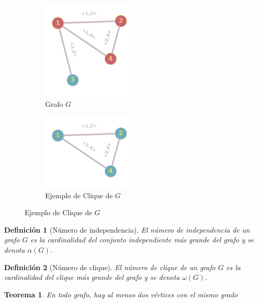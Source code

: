 \documentclass[a4paper,1pt]{report}
\newtheorem*{teo}{Teorema}
\newtheorem*{dfn}{Definición}
\begin{document}
\begin{figure}[H]
    \centering
    \begin{subfigure}[b]{0.45\textwidth}
    \centering
    \includegraphics[width=0.5\textwidth]{figures/clique.png}
    \caption{Grafo $G$}
    \end{subfigure}
    \begin{subfigure}[b]{0.45\textwidth}
        \centering
    \includegraphics[width=0.5\textwidth]{figures/clique1.png}
    \caption{Ejemplo de Clique de $G$}
    \end{subfigure}
\end{figure} 

\begin{dfn}[N\'umero de independencia]
    El número de independencia de un grafo $G$ es la cardinalidad del conjunto independiente más grande del grafo y se denota $\alpha(G)$.
\end{dfn}

\begin{dfn}[N\'umero de clique]
    El número de clique de un grafo $G$ es la cardinalidad del clique más grande del grafo y se denota $\omega(G)$.
\end{dfn}

\begin{teo}
    En todo grafo, hay al menos dos v\'ertices con el mismo grado
\end{teo}
\end{document}
